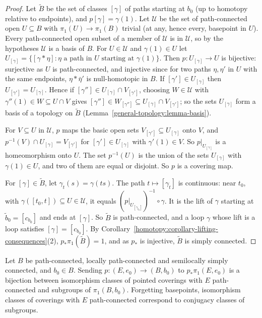 \begin{proof}
Let $\tilde{B}$ be the set of classes $[\gamma]$ of paths starting at $b_0$ (up to homotopy relative to endpoints), and $p[\gamma] = \gamma(1)$. Let $\mathcal{U}$
be the set of path-connected open $U \subseteq B$ with $\pi_1(U) \to \pi_1(B)$ trivial (at any, hence every, basepoint in $U$). Every path-connected open subset of a
member of $\mathcal{U}$ is in $\mathcal{U}$, so by the hypotheses $\mathcal{U}$ is a basis of $B$. For $U \in \mathcal{U}$ and $\gamma(1) \in U$ let
$U_{[\gamma]} = \{[\gamma * \eta] : \eta \text{ a path in } U \text{ starting at } \gamma(1)\}$. Then $p \colon U_{[\gamma]} \to U$ is bijective: surjective as $U$ is
path-connected, and injective since for two paths $\eta, \eta'$ in $U$ with the same endpoints, $\eta * \bar\eta'$ is null-homotopic in $B$. If
$[\gamma'] \in U_{[\gamma]}$ then $U_{[\gamma']} = U_{[\gamma]}$. Hence if $[\gamma''] \in U_{[\gamma]} \cap V_{[\gamma']}$, choosing $W \in \mathcal{U}$ with
$\gamma''(1) \in W \subseteq U \cap V$ gives $[\gamma''] \in W_{[\gamma'']} \subseteq U_{[\gamma]} \cap V_{[\gamma']}$; so the sets $U_{[\gamma]}$ form a basis of a
topology on $\tilde{B}$ (Lemma~\ref{general-topology:lemma-basis}).

For $V \subseteq U$ in $\mathcal{U}$, $p$ maps the basic open sets $V_{[\gamma']} \subseteq U_{[\gamma]}$ onto $V$, and $p^{-1}(V) \cap U_{[\gamma]} = V_{[\gamma']}$ for
$[\gamma'] \in U_{[\gamma]}$ with $\gamma'(1) \in V$. So $p|_{U_{[\gamma]}}$ is a homeomorphism onto $U$. The set $p^{-1}(U)$ is the union of the sets $U_{[\gamma]}$ with
$\gamma(1) \in U$, and two of them are equal or disjoint. So $p$ is a covering map.

For $[\gamma] \in \tilde{B}$, let $\gamma_t(s) = \gamma(ts)$. The path $t \mapsto [\gamma_t]$ is continuous: near $t_0$, with $\gamma([t_0, t]) \subseteq U \in \mathcal{U}$,
it equals $(p|_{U_{[\gamma_{t_0}]}})^{-1} \circ \gamma$. It is the lift of $\gamma$ starting at $\tilde{b}_0 = [c_{b_0}]$ and ends at $[\gamma]$. So $\tilde{B}$ is
path-connected, and a loop $\gamma$ whose lift is a loop satisfies $[\gamma] = [c_{b_0}]$. By Corollary~\ref{homotopy:corollary-lifting-consequences}(2),
$p_*\pi_1(\tilde{B}) = 1$, and as $p_*$ is injective, $\tilde{B}$ is simply connected.
\end{proof}

\begin{theorem}\label{homotopy:theorem-classification}
Let $B$ be path-connected, locally path-connected and semilocally simply connected, and $b_0 \in B$. Sending $p \colon (E, e_0) \to (B, b_0)$ to
$p_*\pi_1(E, e_0)$ is a bijection between isomorphism classes of pointed coverings with $E$ path-connected and subgroups of $\pi_1(B, b_0)$. Forgetting basepoints,
isomorphism classes of coverings with $E$ path-connected correspond to conjugacy classes of subgroups.
\end{theorem}

